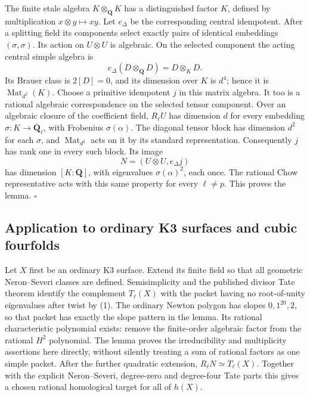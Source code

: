 The finite etale algebra \(K\otimes_{\mathbf Q}K\) has a distinguished
factor \(K\), defined by multiplication \(x\otimes y\mapsto xy\).
Let \(e_\Delta\) be the corresponding central idempotent. After a
splitting field its components select exactly pairs of identical
embeddings \((\sigma,\sigma)\). Its action on \(U\otimes U\) is
algebraic. On the selected component the acting central simple algebra
is
\[
 e_\Delta(D\otimes_{\mathbf Q}D)=D\otimes_KD.
 \tag{ARCH-15.O1}
\]
Its Brauer class is \(2[D]=0\), and its dimension over \(K\) is
\(d^4\); hence it is \(\operatorname{Mat}_{d^2}(K)\). Choose a
primitive idempotent \(j\) in this matrix algebra. It too is a
rational algebraic correspondence on the selected tensor component.
Over an algebraic closure of the coefficient field, \(R_\ell U\)
has dimension \(d\) for every embedding \(\sigma:K\to
\overline{\mathbf Q}_\ell\), with Frobenius \(\sigma(\alpha)\).
The diagonal tensor block has dimension \(d^2\) for each \(\sigma\),
and \(\operatorname{Mat}_{d^2}\) acts on it by its standard
representation. Consequently \(j\) has rank one in every such block.
Its image
\[
 N=(U\otimes U,e_\Delta j)
 \tag{ARCH-15.O2}
\]
has dimension \([K:\mathbf Q]\), with eigenvalues
\(\sigma(\alpha)^2\), each once. The rational Chow representative
acts with this same property for every \(\ell\ne p\). This proves
the lemma. \(\square\)

\subsection{Application to ordinary K3 surfaces and cubic fourfolds}

Let \(X\) first be an ordinary K3 surface. Extend its finite field so
that all geometric Neron--Severi classes are defined. Semisimplicity
and the published divisor Tate theorem identify the complement
\(T_\ell(X)\) with the packet having no root-of-unity eigenvalues after
twist by (1). The ordinary Newton polygon has slopes
\(0,1^{20},2\), so that packet has exactly the slope pattern in the
lemma. Its rational characteristic polynomial exists: remove the
finite-order algebraic factor from the rational \(H^2\) polynomial.
The lemma proves the irreducibility and multiplicity assertions here
directly, without silently treating a sum of rational factors as one
simple packet. After the further quadratic extension,
\(R_\ell N\simeq T_\ell(X)\). Together with the explicit
Neron--Severi, degree-zero and degree-four Tate parts this gives a
chosen rational homological target for all of \(h(X)\).

